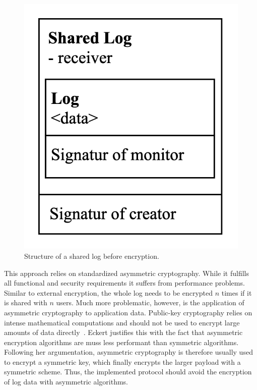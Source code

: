 \documentclass[../main.tex]{subfiles}
\begin{document}
\begin{figure}[ht]
    \includegraphics[scale=0.2]{../img/04/mutual_encryption.png}
    \centering
    \caption[Structure shared log]{Structure of a shared log before encryption.}
    \label{fig:mutual_encryption}
\end{figure}

This approach relies on standardized asymmetric cryptography.
While it fulfills all functional and security requirements it suffers from performance problems.
Similar to external encryption, the whole log needs to be encrypted $n$ times if it is shared with $n$ users.
Much more problematic, however, is the application of asymmetric cryptography to application data.
Public-key cryptography relies on intense mathematical computations and should not be used to encrypt large amounts of data directly~\cite[340]{Eckert2018}.
Eckert justifies this with the fact that asymmetric encryption algorithms are muss less performant than symmetric algorithms.
Following her argumentation, asymmetric cryptography is therefore usually used to encrypt a symmetric key, which finally encrypts the larger payload with a symmetric scheme.
Thus, the implemented protocol should avoid the encryption of log data with asymmetric algorithms.
\end{document}

